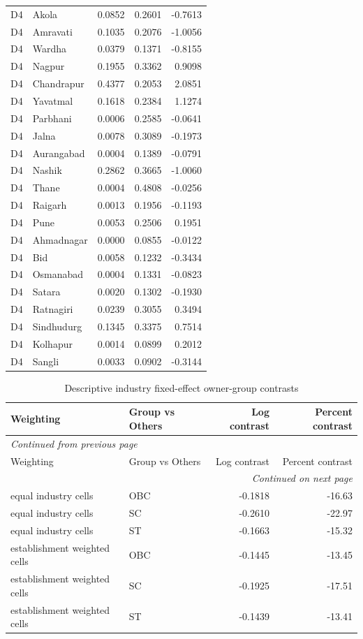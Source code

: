 \documentclass[11pt,a4paper]{report}
\begin{document}
\begin{longtable}{l>{\raggedright\arraybackslash}p{5cm}rrr}
D4 & Akola & 0.0852 & 0.2601 & -0.7613 \\
D4 & Amravati & 0.1035 & 0.2076 & -1.0056 \\
D4 & Wardha & 0.0379 & 0.1371 & -0.8155 \\
D4 & Nagpur & 0.1955 & 0.3362 & 0.9098 \\
D4 & Chandrapur & 0.4377 & 0.2053 & 2.0851 \\
D4 & Yavatmal & 0.1618 & 0.2384 & 1.1274 \\
D4 & Parbhani & 0.0006 & 0.2585 & -0.0641 \\
D4 & Jalna & 0.0078 & 0.3089 & -0.1973 \\
D4 & Aurangabad & 0.0004 & 0.1389 & -0.0791 \\
D4 & Nashik & 0.2862 & 0.3665 & -1.0060 \\
D4 & Thane & 0.0004 & 0.4808 & -0.0256 \\
D4 & Raigarh & 0.0013 & 0.1956 & -0.1193 \\
D4 & Pune & 0.0053 & 0.2506 & 0.1951 \\
D4 & Ahmadnagar & 0.0000 & 0.0855 & -0.0122 \\
D4 & Bid & 0.0058 & 0.1232 & -0.3434 \\
D4 & Osmanabad & 0.0004 & 0.1331 & -0.0823 \\
D4 & Satara & 0.0020 & 0.1302 & -0.1930 \\
D4 & Ratnagiri & 0.0239 & 0.3055 & 0.3494 \\
D4 & Sindhudurg & 0.1345 & 0.3375 & 0.7514 \\
D4 & Kolhapur & 0.0014 & 0.0899 & 0.2012 \\
D4 & Sangli & 0.0033 & 0.0902 & -0.3144 \\
\end{longtable}\endgroup
\begingroup\footnotesize\setlength{\tabcolsep}{4pt}
\begin{longtable}{llrr}
\caption{Descriptive industry fixed-effect owner-group contrasts}\\\toprule
Weighting & Group vs Others & Log contrast & Percent contrast \\\midrule\endfirsthead
\multicolumn{4}{l}{\textit{Continued from previous page}}\\\toprule
Weighting & Group vs Others & Log contrast & Percent contrast \\\midrule\endhead
\midrule\multicolumn{4}{r}{\textit{Continued on next page}}\\\endfoot\bottomrule\endlastfoot
equal industry cells & OBC & -0.1818 & -16.63 \\
equal industry cells & SC & -0.2610 & -22.97 \\
equal industry cells & ST & -0.1663 & -15.32 \\
establishment weighted cells & OBC & -0.1445 & -13.45 \\
establishment weighted cells & SC & -0.1925 & -17.51 \\
establishment weighted cells & ST & -0.1439 & -13.41 \\
\end{longtable}\endgroup
\end{document}
